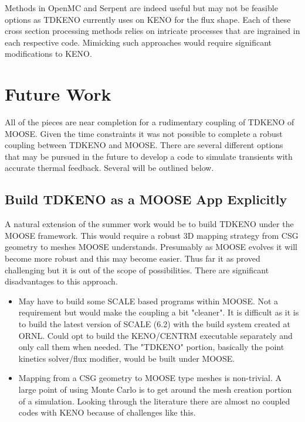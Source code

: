 \documentclass[11pt]{article}
\begin{document}
Methods in OpenMC and Serpent are indeed  useful but may not be feasible options as TDKENO  currently uses  on KENO for the flux shape.  Each of these cross section processing methods relies on intricate processes that are ingrained in each respective code.  Mimicking such approaches would require significant modifications to KENO.  



\section{Future Work}
All of the pieces are near  completion for a rudimentary coupling of TDKENO of MOOSE.  Given the time constraints it was not possible to complete a robust coupling between TDKENO and MOOSE.  There are several different options that may be pursued in the future to develop a code to simulate transients with accurate thermal feedback. Several will be outlined below. 

\subsection{Build TDKENO as a MOOSE App Explicitly}  
A natural extension of the summer work would be to build TDKENO under the MOOSE framework.  This would require a robust 3D mapping strategy from CSG geometry to meshes MOOSE understands.  Presumably as MOOSE evolves it will become more robust and this may become easier.  Thus far it as proved challenging but it is out of the scope of possibilities.   
There are significant disadvantages to this approach.

\begin{itemize}
    \item May have to build some SCALE based programs within MOOSE. Not a requirement but would make the coupling a bit "cleaner".  It is difficult as it is to build the latest version of SCALE (6.2) with the build system created at ORNL. Could opt to build the KENO/CENTRM executable separately and only call them when needed.  The "TDKENO" portion, basically the point kinetics solver/flux modifier, would be built under MOOSE.
    \item Mapping from a CSG geometry to MOOSE type meshes is non-trivial.  A large point of using Monte Carlo is to get around the mesh creation portion of a simulation. Looking through the literature there are almost no coupled codes with KENO because of challenges like this.   
\end{itemize}
\end{document}
